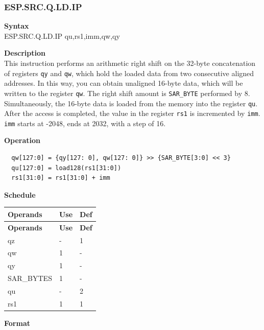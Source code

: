 \newpage
\subsubsection{ESP.SRC.Q.LD.IP}\label{instruction:ESPSRCQLDIP}
\textbf{Syntax}\\
ESP.SRC.Q.LD.IP qu,rs1,imm,qw,qy

\textbf{Description}\\
This instruction performs an arithmetic right shift on the 32-byte concatenation of registers \lstinline{qy} and \lstinline{qw}, which hold the loaded data from two consecutive aligned addresses. In this way, you can obtain unaligned 16-byte data, which will be written to the register \lstinline{qw}. The right shift amount is \lstinline{SAR_BYTE} performed by 8.\\
Simultaneously, the 16-byte data is loaded from the memory into the register \lstinline{qu}. After the access is completed, the value in the register \lstinline{rs1} is incremented by \lstinline{imm}.\\

\lstinline{imm} starts at -2048, ends at 2032, with a step of 16.

\textbf{Operation}
\begin{lstlisting}
  qw[127:0] = {qy[127: 0], qw[127: 0]} >> {SAR_BYTE[3:0] << 3}
  qu[127:0] = load128(rs1[31:0])
  rs1[31:0] = rs1[31:0] + imm
\end{lstlisting}

\textbf{Schedule}\\
\begin{longtable}[c]{|l|l|l|}
    \hline
    \rowcolor{lightgray}
    \textbf{Operands} & \textbf{Use} & \textbf{Def} \\\hline
    \endfirsthead
    \hline
    \rowcolor{lightgray}
     \textbf{Operands} & \textbf{Use} & \textbf{Def} \\\hline
    \endhead
    \hline
    \endfoot

  qz & - & 1 \\\hline
  qw & 1 & - \\\hline
  qy & 1 & - \\\hline
  SAR\_BYTES & 1 & - \\\hline
  qu & - & 2 \\\hline
  rs1 & 1 & 1

\end{longtable}

\textbf{Format}\\

